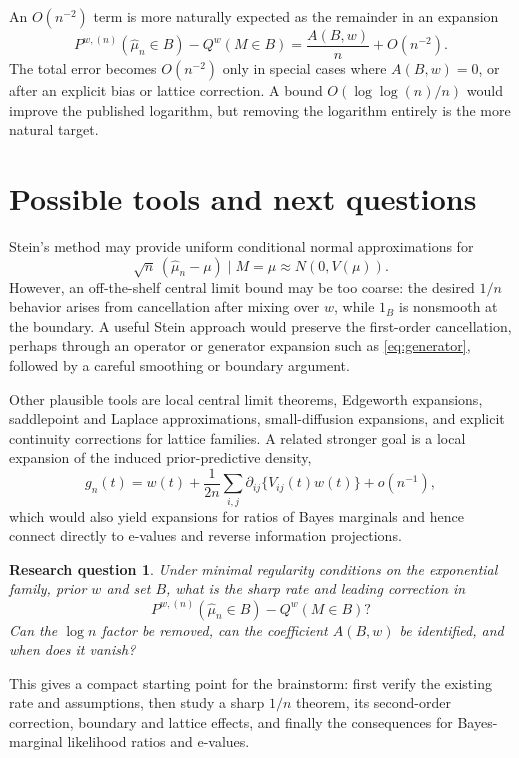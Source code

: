 \documentclass[11pt]{article}
\newtheorem{question}{Research question}
\begin{document}
An $O(n^{-2})$ term is more naturally expected as the remainder in an
expansion
\[
  P^{w,(n)}(\widehat\mu_n\in B)-Q^w(M\in B)
  =\frac{A(B,w)}n+O(n^{-2}).
\]
The total error becomes $O(n^{-2})$ only in special cases where $A(B,w)=0$,
or after an explicit bias or lattice correction.  A bound
$O(\log\log(n)/n)$ would improve the published logarithm, but removing the
logarithm entirely is the more natural target.

\section{Possible tools and next questions}

Stein's method may provide uniform conditional normal approximations for
\[
  \sqrt n\,(\widehat\mu_n-\mu)\mid M=\mu
  \approx N(0,V(\mu)).
\]
However, an off-the-shelf central limit bound may be too coarse: the desired
$1/n$ behavior arises from cancellation after mixing over $w$, while
$1_B$ is nonsmooth at the boundary.  A useful Stein approach would preserve
the first-order cancellation, perhaps through an operator or generator
expansion such as \eqref{eq:generator}, followed by a careful smoothing or
boundary argument.

Other plausible tools are local central limit theorems, Edgeworth expansions,
saddlepoint and Laplace approximations, small-diffusion expansions, and
explicit continuity corrections for lattice families.  A related stronger
goal is a local expansion of the induced
prior-predictive density,
\[
  g_n(t)=w(t)+\frac1{2n}
  \sum_{i,j}\partial_{ij}\{V_{ij}(t)w(t)\}+o(n^{-1}),
\]
which would also yield expansions for ratios of Bayes marginals and hence
connect directly to e-values and reverse information projections.

\begin{question}
Under minimal regularity conditions on the exponential family, prior $w$ and
set $B$, what is the sharp rate and leading correction in
\[
  P^{w,(n)}(\widehat\mu_n\in B)-Q^w(M\in B)?
\]
Can the $\log n$ factor be removed, can the coefficient $A(B,w)$ be
identified, and when does it vanish?
\end{question}

This gives a compact starting point for the brainstorm: first verify the
existing rate and assumptions, then study a sharp $1/n$ theorem, its
second-order correction, boundary and lattice effects, and finally the
consequences for Bayes-marginal likelihood ratios and e-values.
\end{document}
